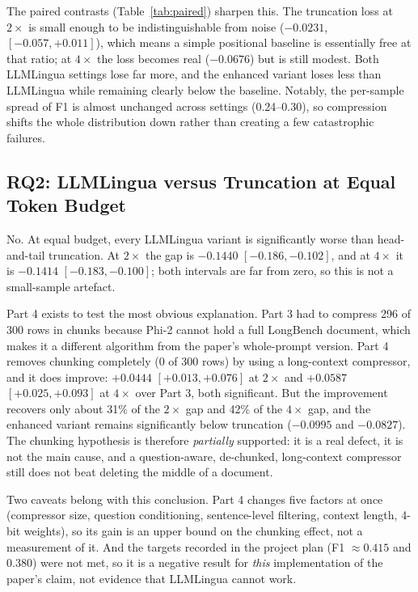 \documentclass[10pt,a4paper,twocolumn]{article}
\begin{document}
The paired contrasts (Table~\ref{tab:paired}) sharpen this. The truncation loss at
$2\times$ is small enough to be indistinguishable from noise
($-0.0231$, $[-0.057,+0.011]$), which means a simple positional baseline is
essentially free at that ratio; at $4\times$ the loss becomes real
($-0.0676$) but is still modest. Both LLMLingua settings lose far more, and the
enhanced variant loses less than LLMLingua while remaining clearly below the
baseline. Notably, the per-sample spread of F1 is almost unchanged across settings
(0.24--0.30), so compression shifts the whole distribution down rather than
creating a few catastrophic failures.

\subsection{RQ2: LLMLingua versus Truncation at Equal Token Budget}
\label{sec:rq2}

No. At equal budget, every LLMLingua variant is significantly worse than
head-and-tail truncation. At $2\times$ the gap is $-0.1440$
$[-0.186,-0.102]$, and at $4\times$ it is $-0.1414$ $[-0.183,-0.100]$; both
intervals are far from zero, so this is not a small-sample artefact.

Part 4 exists to test the most obvious explanation. Part 3 had to compress 296 of
300 rows in chunks because Phi-2 cannot hold a full LongBench document, which makes
it a different algorithm from the paper's whole-prompt version. Part 4 removes
chunking completely (0 of 300 rows) by using a long-context compressor, and it does
improve: $+0.0444$ $[+0.013,+0.076]$ at $2\times$ and $+0.0587$
$[+0.025,+0.093]$ at $4\times$ over Part 3, both significant. But the improvement
recovers only about 31\% of the $2\times$ gap and 42\% of the $4\times$ gap, and
the enhanced variant remains significantly below truncation
($-0.0995$ and $-0.0827$). The chunking hypothesis is therefore
\emph{partially} supported: it is a real defect, it is not the main cause, and a
question-aware, de-chunked, long-context compressor still does not beat deleting
the middle of a document.

Two caveats belong with this conclusion. Part 4 changes five factors at once
(compressor size, question conditioning, sentence-level filtering, context length,
4-bit weights), so its gain is an upper bound on the chunking effect, not a
measurement of it. And the targets recorded in the project plan (F1 $\approx 0.415$ and $0.380$) were
not met, so it is a negative result for \emph{this} implementation of the paper's
claim, not evidence that LLMLingua cannot work.
\end{document}
